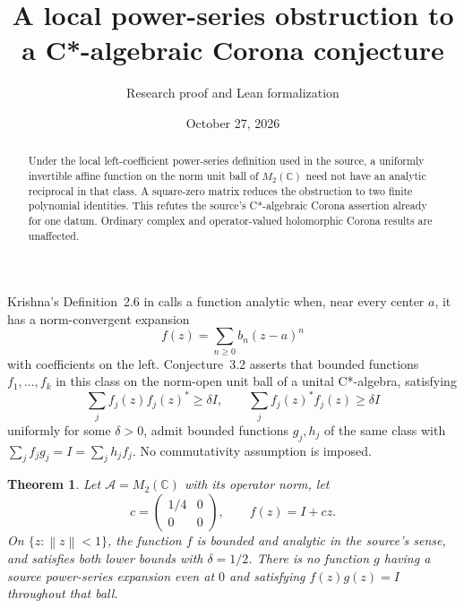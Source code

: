 \documentclass[11pt]{article}
\title{A local power-series obstruction to a C*-algebraic Corona conjecture}
\author{Research proof and Lean formalization}
\date{October 27, 2026}
\newtheorem{theorem}{Theorem}
\newcommand{\C}{\mathbb C}
\newcommand{\norm}[1]{\left\lVert#1\right\rVert}
\begin{document}
\maketitle
\begin{abstract}
Under the local left-coefficient power-series definition used in the source,
a uniformly invertible affine function on the norm unit ball of $M_2(\C)$
need not have an analytic reciprocal in that class. A square-zero matrix
reduces the obstruction to two finite polynomial identities. This refutes
the source's C*-algebraic Corona assertion already for one datum. Ordinary
complex and operator-valued holomorphic Corona results are unaffected.
\end{abstract}

Krishna's Definition~2.6 in \cite{Krishna} calls a function analytic when,
near every center $a$, it has a norm-convergent expansion
\[
 f(z)=\sum_{n\geq0}b_n(z-a)^n
\]
with coefficients on the left. Conjecture~3.2 asserts that bounded functions
$f_1,\ldots,f_k$ in this class on the norm-open unit ball of a unital
C*-algebra, satisfying
\[
 \sum_j f_j(z)f_j(z)^*\geq\delta I,\qquad
 \sum_j f_j(z)^*f_j(z)\geq\delta I
\]
uniformly for some $\delta>0$, admit bounded functions $g_j,h_j$ of the
same class with $\sum_j f_jg_j=I=\sum_jh_jf_j$.
No commutativity assumption is imposed.

\begin{theorem}\label{main}
Let $\mathcal A=M_2(\C)$ with its operator norm, let
\[
 c=\begin{pmatrix}1/4&0\\0&0\end{pmatrix},\qquad f(z)=I+cz.
\]
On $\{z:\norm z<1\}$, the function $f$ is bounded and analytic in the
source's sense, and satisfies both lower bounds with $\delta=1/2$.
There is no function $g$ having a source power-series expansion even at
$0$ and satisfying $f(z)g(z)=I$ throughout that ball.
\end{theorem}
\end{document}
